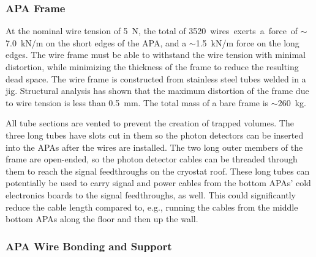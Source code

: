 \subsubsection{APA Frame}
\label{subsec:fd-ref-apaframes}


At the nominal wire tension of 5~N, the total of \SI{3520} wires exerts a
force of $\sim$7.0~kN/m on the short edges of the APA, and a
$\sim$1.5~kN/m force on the long edges. The wire frame must be able to
withstand the wire tension with minimal distortion, while minimizing
the thickness of the frame to reduce the resulting dead space.  The
wire frame is constructed from stainless steel tubes welded in a
jig.  Structural analysis has shown that the maximum distortion of the
frame due to wire tension is less than 0.5~mm. The total mass of a
bare frame is $\sim$260~kg.


All tube sections are vented to prevent the creation of trapped
volumes.  The three long tubes have slots cut in them so the photon
detectors can be inserted into the APAs after the wires are installed. 
The two long outer members of the frame are open-ended, so the photon
detector cables can be threaded through them to reach the signal
feedthroughs on the cryostat roof.  These long tubes can potentially
be used to carry signal and power cables from the bottom APAs' cold
electronics boards to the signal feedthroughs, as well.  This could significantly 
reduce the cable length %
compared to, e.g.,
running the cables from the middle bottom APAs %
along the floor and then up the wall.


\subsubsection{APA Wire Bonding and Support}
\label{subsec:fd-ref-wirewrap}


